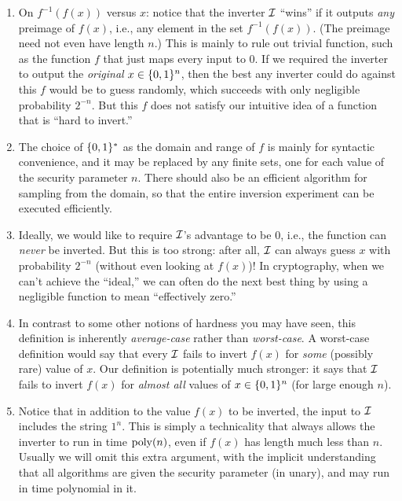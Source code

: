 \documentclass[11pt]{article}
\begin{document}
\begin{enumerate}
\item On $f^{-1}(f(x))$ versus $x$: notice that the inverter $\mathcal{I}$
  ``wins'' if it outputs \emph{any} preimage of $f(x)$, i.e., any
  element in the set $f^{-1}(f(x))$.  (The preimage need not even have
  length $n$.)  This is mainly to rule out trivial function, such as
  the function $f$ that just maps every input to $0$.  If we required
  the inverter to output the \emph{original} $x \in \{0,1\}^{n}$, then
  the best any inverter could do against this $f$ would be to guess
  randomly, which succeeds with only negligible probability $2^{-n}$.
  But this $f$ does not satisfy our intuitive idea of a function that
  is ``hard to invert.''
  
\item The choice of $\{0,1\}^{*}$ as the domain and range of $f$ is
  mainly for syntactic convenience, and it may be replaced by any
  finite sets, one for each value of the security parameter $n$.
  There should also be an efficient algorithm for sampling from the
  domain, so that the entire inversion experiment can be executed
  efficiently.

\item Ideally, we would like to require $\mathcal{I}$'s advantage to be $0$,
  i.e., the function can \emph{never} be inverted.  But this is too
  strong: after all, $\mathcal{I}$ can always guess $x$ with probability
  $2^{-n}$ (without even looking at $f(x)$)!  In cryptography, when we
  can't achieve the ``ideal,'' we can often do the next best thing by
  using a negligible function to mean ``effectively zero.''
  
\item In contrast to some other notions of hardness you may have seen,
  this definition is inherently \emph{average-case} rather than
  \emph{worst-case}.  A worst-case definition would say that every
  $\mathcal{I}$ fails to invert $f(x)$ for \emph{some} (possibly rare) value
  of $x$.  Our definition is potentially much stronger: it says that
  $\mathcal{I}$ fails to invert $f(x)$ for \emph{almost all} values of $x \in
  \{0,1\}^{n}$ (for large enough $n$).\label{item:worst-average}
  
\item Notice that in addition to the value $f(x)$ to be inverted, the
  input to $\mathcal{I}$ includes the string $1^{n}$.  This is simply a
  technicality that always allows the inverter to run in time
  $\operatorname{poly}(n)$, even if $f(x)$ has length much less than $n$.  Usually
  we will omit this extra argument, with the implicit understanding
  that all algorithms are given the security parameter (in unary), and
  may run in time polynomial in it.
\end{enumerate}
\end{document}
